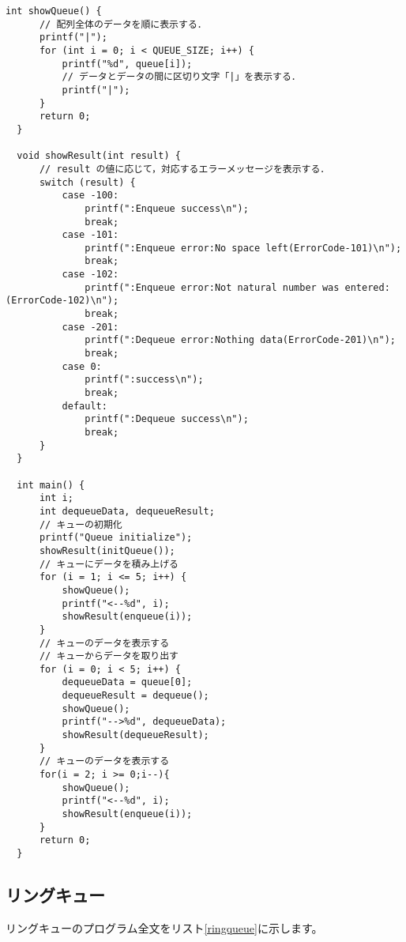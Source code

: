 \documentclass[a4j]{jarticle}
\begin{document}
\begin{lstlisting}[caption=再構築するキューのプログラム,label=queue]
  int showQueue() {
      // 配列全体のデータを順に表示する．
      printf("|");
      for (int i = 0; i < QUEUE_SIZE; i++) {
          printf("%d", queue[i]);
          // データとデータの間に区切り文字「|」を表示する．
          printf("|");
      }
      return 0;
  }
  
  void showResult(int result) {
      // result の値に応じて，対応するエラーメッセージを表示する．
      switch (result) {
          case -100:
              printf(":Enqueue success\n");
              break;
          case -101:
              printf(":Enqueue error:No space left(ErrorCode-101)\n");
              break;
          case -102:
              printf(":Enqueue error:Not natural number was entered:(ErrorCode-102)\n");
              break;
          case -201:
              printf(":Dequeue error:Nothing data(ErrorCode-201)\n");
              break;
          case 0:
              printf(":success\n");
              break;
          default:
              printf(":Dequeue success\n");
              break;
      }
  }
  
  int main() {
      int i;
      int dequeueData, dequeueResult;
      // キューの初期化
      printf("Queue initialize");
      showResult(initQueue());
      // キューにデータを積み上げる
      for (i = 1; i <= 5; i++) {
          showQueue();
          printf("<--%d", i);
          showResult(enqueue(i));
      }
      // キューのデータを表示する
      // キューからデータを取り出す
      for (i = 0; i < 5; i++) {
          dequeueData = queue[0];
          dequeueResult = dequeue();
          showQueue();
          printf("-->%d", dequeueData);
          showResult(dequeueResult);
      }
      // キューのデータを表示する
      for(i = 2; i >= 0;i--){
          showQueue();
          printf("<--%d", i);
          showResult(enqueue(i));
      }
      return 0;
  }
\end{lstlisting}

\subsection{リングキュー}
リングキューのプログラム全文をリスト\ref{ringqueue}に示します。
\end{document}
